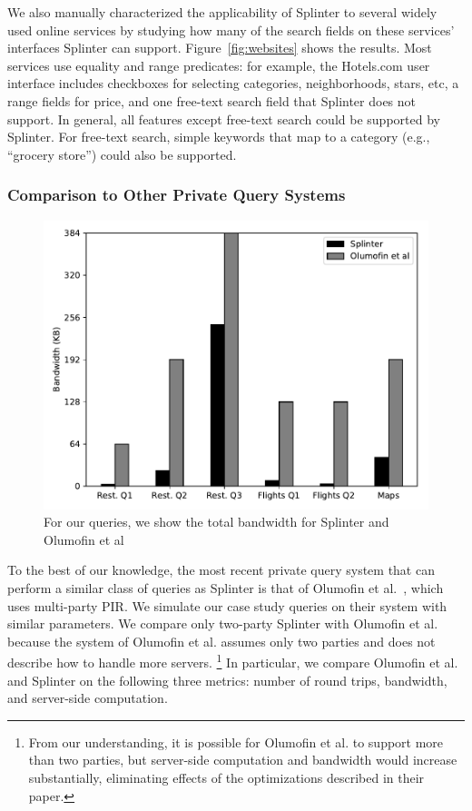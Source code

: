 We also manually characterized the applicability of Splinter to several widely used online services by studying how many of the search fields on these services' interfaces Splinter can support.
Figure~\ref{fig:websites} shows the results. 
Most services use equality and range predicates: for example, the
Hotels.com user interface includes checkboxes for selecting categories, neighborhoods, stars, etc, a range fields for price, and one free-text search field that Splinter does not support.
In general, all features except free-text search could be supported by Splinter.
For free-text search, simple keywords that map to a category (e.g., ``grocery store'') could also be supported.

\subsubsection{Comparison to Other Private Query Systems}
\label{sec:comparison}

\begin{figure}
	\centering
	\includegraphics[width=\textwidth]{splinter-figs/bandwidth_comparison.pdf}
	\caption{For our queries, we show the total bandwidth for Splinter and Olumofin et al~\cite{goldberg}}
	\label{fig:bandwidth_comp}
\end{figure}

To the best of our knowledge, the most recent
private query system that can perform a similar class of queries
as Splinter is that of Olumofin et al.~\cite{goldberg},
which uses multi-party PIR. We simulate our case study queries 
on their system with similar parameters.
We compare only two-party Splinter with Olumofin et al.
because the system of Olumofin et al. assumes only two parties 
and does not describe how to handle more servers.
\footnote{From our understanding, it is possible for Olumofin et al. to support
	more than two parties, but server-side computation and bandwidth would increase
	substantially, eliminating effects of the optimizations described in their paper.}
In particular, we compare Olumofin et al. and Splinter on
the following three metrics: number of  
round trips, bandwidth, and server-side computation. 

